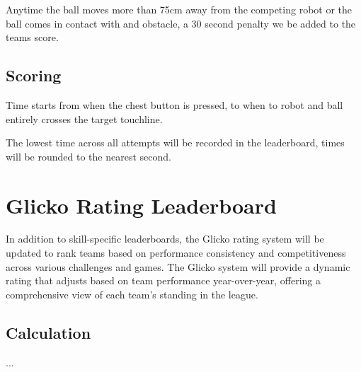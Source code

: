 Anytime the ball moves more than 75cm away from the competing robot or the ball comes in contact with
and obstacle, a 30 second penalty we be added to the teams score.

\subsection{Scoring}
Time starts from when the chest button is pressed, to when to robot and ball entirely crosses the target touchline.

The lowest time across all attempts will be recorded in the leaderboard, times will be rounded to the nearest second.

\section{Glicko Rating Leaderboard}
In addition to skill-specific leaderboards, the Glicko rating system will be updated to rank teams based on
performance consistency and competitiveness across various challenges and games.
The Glicko system will provide a dynamic rating that adjusts based on team performance
year-over-year, offering a comprehensive view of each team's standing in the league.

\subsection{Calculation}
...
